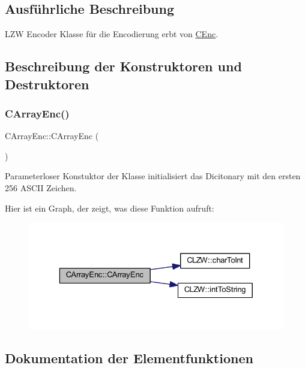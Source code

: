 \subsection{Ausführliche Beschreibung}
L\+ZW Encoder Klasse für die Encodierung erbt von \hyperlink{class_c_enc}{C\+Enc}. 

\subsection{Beschreibung der Konstruktoren und Destruktoren}
\mbox{\label{class_c_array_enc_ad583bca8c7872d055f6118219f657970}} 
\subsubsection{\texorpdfstring{C\+Array\+Enc()}{CArrayEnc()}}
{\footnotesize\ttfamily C\+Array\+Enc\+::\+C\+Array\+Enc (\begin{DoxyParamCaption}{ }\end{DoxyParamCaption})}



Parameterloser Konstuktor der Klasse initialisiert das Dicitonary mit den ersten 256 A\+S\+C\+II Zeichen. 

Hier ist ein Graph, der zeigt, was diese Funktion aufruft\+:
\nopagebreak
\begin{figure}[H]
\begin{center}
\leavevmode
\includegraphics[width=329pt]{class_c_array_enc_ad583bca8c7872d055f6118219f657970_cgraph}
\end{center}
\end{figure}


\subsection{Dokumentation der Elementfunktionen}
\mbox{\label{class_c_array_enc_a51984cee678c54c93caf73aa82b596cc}} 

